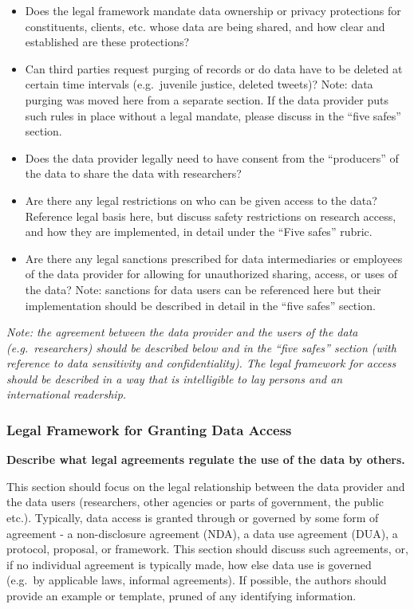 \documentclass[
]{book}
\providecommand{\tightlist}{%
  \setlength{\itemsep}{0pt}\setlength{\parskip}{0pt}}
\begin{document}
\begin{itemize}
\tightlist
\item
  Does the legal framework mandate data ownership or privacy protections for constituents, clients, etc. whose data are being shared, and how clear and established are these protections?
\item
  Can third parties request purging of records or do data have to be deleted at certain time intervals (e.g.~juvenile justice, deleted tweets)? Note: data purging was moved here from a separate section. If the data provider puts such rules in place without a legal mandate, please discuss in the ``five safes'' section.
\item
  Does the data provider legally need to have consent from the ``producers'' of the data to share the data with researchers?
\item
  Are there any legal restrictions on who can be given access to the data? Reference legal basis here, but discuss safety restrictions on research access, and how they are implemented, in detail under the ``Five safes'' rubric.
\item
  Are there any legal sanctions prescribed for data intermediaries or employees of the data provider for allowing for unauthorized sharing, access, or uses of the data? Note: sanctions for data users can be referenced here but their implementation should be described in detail in the ``five safes'' section.
\end{itemize}

\emph{Note: the agreement between the data provider and the users of the data (e.g.~researchers) should be described below and in the ``five safes'' section (with reference to data sensitivity and confidentiality). The legal framework for access should be described in a way that is intelligible to lay persons and an international readership.}

\hypertarget{legal-framework-for-granting-data-access-8}{%
\subsubsection*{Legal Framework for Granting Data Access}\label{legal-framework-for-granting-data-access-8}}

\textbf{Describe what legal agreements regulate the use of the data by others.}

This section should focus on the legal relationship between the data provider and the data users (researchers, other agencies or parts of government, the public etc.). Typically, data access is granted through or governed by some form of agreement - a non-disclosure agreement (NDA), a data use agreement (DUA), a protocol, proposal, or framework. This section should discuss such agreements, or, if no individual agreement is typically made, how else data use is governed (e.g.~by applicable laws, informal agreements). If possible, the authors should provide an example or template, pruned of any identifying information.
\end{document}
